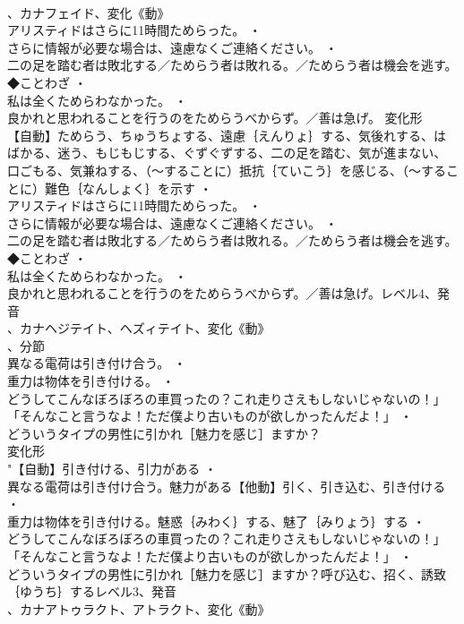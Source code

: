 \documentclass[8pt]{extreport}
\begin{document}
\begin{CJK}{UTF8}{min}
\\	、カナフェイド、変化《動》
\\	アリスティドはさらに11時間ためらった。 ・
\\	さらに情報が必要な場合は、遠慮なくご連絡ください。 ・
\\	二の足を踏む者は敗北する／ためらう者は敗れる。／ためらう者は機会を逃す。◆ことわざ ・
\\	私は全くためらわなかった。 ・
\\	良かれと思われることを行うのをためらうべからず。／善は急げ。	変化形 
\\	【自動】ためらう、ちゅうちょする、遠慮｛えんりょ｝する、気後れする、はばかる、迷う、もじもじする、ぐずぐずする、二の足を踏む、気が進まない、口ごもる、気兼ねする、（～することに）抵抗｛ていこう｝を感じる、（～することに）難色｛なんしょく｝を示す ・
\\	アリスティドはさらに11時間ためらった。 ・
\\	さらに情報が必要な場合は、遠慮なくご連絡ください。 ・
\\	二の足を踏む者は敗北する／ためらう者は敗れる。／ためらう者は機会を逃す。◆ことわざ ・
\\	私は全くためらわなかった。 ・
\\	良かれと思われることを行うのをためらうべからず。／善は急げ。レベル4、発音
\\	、カナヘジテイト、ヘズィテイト、変化《動》
\\	、分節
\\	異なる電荷は引き付け合う。 ・
\\	重力は物体を引き付ける。 ・
\\	どうしてこんなぼろぼろの車買ったの？これ走りさえもしないじゃないの！」「そんなこと言うなよ！ただ僕より古いものが欲しかったんだよ！」 ・
\\	どういうタイプの男性に引かれ［魅力を感じ］ますか？
\\	変化形 
\\	"【自動】引き付ける、引力がある ・
\\	異なる電荷は引き付け合う。魅力がある【他動】引く、引き込む、引き付ける ・
\\	重力は物体を引き付ける。魅惑｛みわく｝する、魅了｛みりょう｝する ・
\\	どうしてこんなぼろぼろの車買ったの？これ走りさえもしないじゃないの！」「そんなこと言うなよ！ただ僕より古いものが欲しかったんだよ！」 ・
\\	どういうタイプの男性に引かれ［魅力を感じ］ますか？呼び込む、招く、誘致｛ゆうち｝するレベル3、発音
\\	、カナアトゥラクト、アトラクト、変化《動》

\end{CJK}
\end{document}
